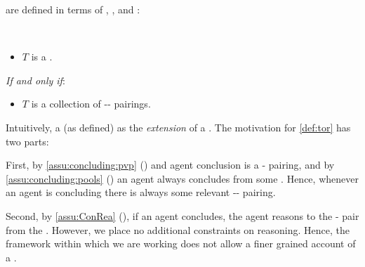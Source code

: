 \begin{note}
   are defined in terms of , , and :

  \begin{definition}[\torN{2}]
    \label{def:tor}
    \mbox{ }
    \vspace{-\baselineskip}
    \begin{itemize}
    \item
      \(T\) is a \torN{}.
    \end{itemize}

    \emph{If and only if}:

    \begin{itemize}
    \item
      \(T\) is a collection of -- pairings.
    \end{itemize}
    \vspace{-\baselineskip}
  \end{definition}

  \noindent%
  Intuitively, a \torN{} (as defined) as the \emph{extension} of a \torN{}.
  The motivation for \autoref{def:tor} has two parts:

  First, by \autoref{assu:concluding:pvp} () and agent conclusion is a - pairing, and by \autoref{assu:concluding:pools} () an agent always concludes from some \pool{}.
  Hence, whenever an agent is concluding there is always some relevant -- pairing.

  Second, by \autoref{assu:ConRea} (), if an agent concludes, the agent reasons to the - pair from the .
  However, we place no additional constraints on reasoning.
  Hence, the framework within which we are working does not allow a finer grained account of a \torN{}.
\end{note}



